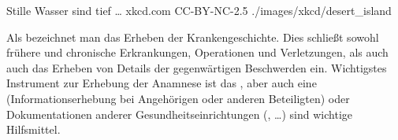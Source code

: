 \PictureWide
{Stille Wasser sind tief \ldots}%
{}%
{}%
{xkcd.com}%
{CC-BY-NC-2.5}%
{./images/xkcd/desert_island}%
{}%
{}%

\bigskip

\noindent Als  bezeichnet man das Erheben der
Krankengeschichte. Dies schließt sowohl frühere und
chronische Erkrankungen, Operationen und Verletzungen, als
auch auch das Erheben von Details der gegenwärtigen Beschwerden ein. 
Wichtigstes
Instrument zur Erhebung der Anamnese ist das
, aber auch eine 
(Informationserhebung bei Angehörigen oder anderen
Beteiligten) oder Dokumentationen anderer
Gesundheitseinrichtungen (, \ldots) sind
wichtige Hilfsmittel.




